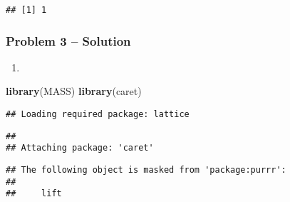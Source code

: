 \documentclass[]{article}
\newenvironment{Shaded}{\begin{snugshade}}{\end{snugshade}}
\newcommand{\CommentTok}[1]{\textcolor[rgb]{0.56,0.35,0.01}{\textit{#1}}}
\newcommand{\DecValTok}[1]{\textcolor[rgb]{0.00,0.00,0.81}{#1}}
\newcommand{\KeywordTok}[1]{\textcolor[rgb]{0.13,0.29,0.53}{\textbf{#1}}}
\newcommand{\NormalTok}[1]{#1}
\newcommand{\OperatorTok}[1]{\textcolor[rgb]{0.81,0.36,0.00}{\textbf{#1}}}
\newcommand{\StringTok}[1]{\textcolor[rgb]{0.31,0.60,0.02}{#1}}
\begin{document}
\begin{verbatim}
## [1] 1
\end{verbatim}

\hypertarget{problem-3-solution}{%
\subsubsection{Problem 3 -- Solution}\label{problem-3-solution}}

\begin{enumerate}
\def\labelenumi{(\alph{enumi})}
\item
\end{enumerate}

\begin{Shaded}
\begin{Highlighting}[]
\KeywordTok{library}\NormalTok{(MASS)}
\KeywordTok{library}\NormalTok{(caret)}
\end{Highlighting}
\end{Shaded}

\begin{verbatim}
## Loading required package: lattice
\end{verbatim}

\begin{verbatim}
## 
## Attaching package: 'caret'
\end{verbatim}

\begin{verbatim}
## The following object is masked from 'package:purrr':
## 
##     lift
\end{verbatim}

\begin{Shaded}
\end{Shaded}
\end{document}
